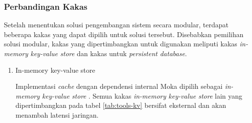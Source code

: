 \subsubsection{Perbandingan Kakas}
Setelah menentukan solusi pengembangan sistem secara modular, terdapat beberapa kakas yang dapat dipilih untuk solusi tersebut. Disebabkan pemilihan solusi modular, kakas yang dipertimbangkan untuk digunakan meliputi kakas \textit{in-memory key-value store} dan kakas untuk \textit{persistent database}.

\begin{enumerate}
    \item In-memory key-value store
    
    Implementasi \textit{cache} dengan dependensi internal Moka dipilih sebagai \textit{in-memory key-value store} \parencite{moka_rs_github}. Semua kakas \textit{in-memory key-value store} lain yang dipertimbangkan pada tabel \ref{tab:tools-kv} bersifat eksternal dan akan menambah latensi jaringan.


\end{enumerate}
